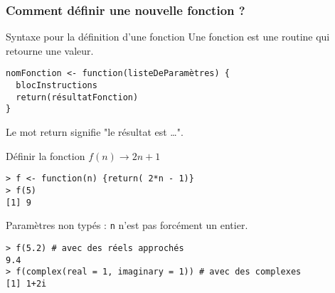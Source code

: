 \documentclass[10pt]{beamer}
\begin{document}
\begin{frame}[fragile]
  \frametitle{Comment définir une nouvelle fonction ?}

  \begin{alertblock}{Syntaxe pour la définition d'une fonction}
    Une fonction est une routine qui retourne une valeur.  
  \begin{lstlisting}[style=edblock]
nomFonction <- function(listeDeParamètres) {
  blocInstructions
  return(résultatFonction)
}
\end{lstlisting}
Le mot \alert{return} signifie "le résultat est \dots".
\end{alertblock}

\begin{exampleblock}{Définir la fonction $f(n) \rightarrow 2n + 1$}
  \begin{lstlisting}[style=block]
> f <- function(n) {return( 2*n - 1)}
> f(5)
[1] 9    
\end{lstlisting}
\end{exampleblock}
\begin{block}{Paramètres non typés : \texttt{n} n'est pas forcément un entier.}
 \begin{lstlisting}[style=block]
> f(5.2) # avec des réels approchés
9.4
> f(complex(real = 1, imaginary = 1)) # avec des complexes
[1] 1+2i
  \end{lstlisting}  
\end{block}
\end{frame}
\end{document}
